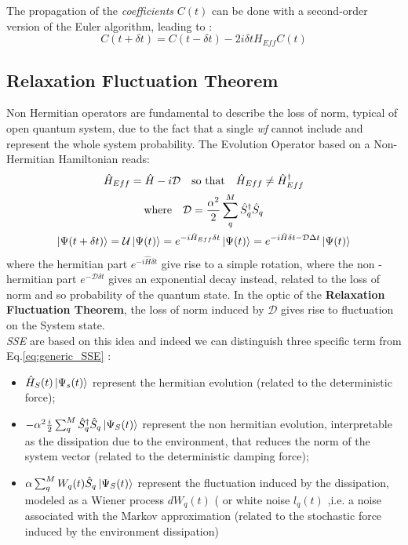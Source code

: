 \documentclass[a4paper,12pt]{article}
\begin{document}
	The propagation of the \textit{coefficients} $ C (t) $ can be done with a second-order version of the Euler algorithm, leading to :
	\begin{equation}
		C (t + \delta t) = C (t - \delta t) - 2i \delta t H_{Eff} C (t)
	\end{equation}
	
	\subsection{Relaxation Fluctuation Theorem}
	\label{sub:Relaxation_Fluctuation_Theorem}
	Non Hermitian operators are fundamental to describe the loss of norm, typical of open quantum system, due to the fact that a single \textit{wf} cannot include and represent the whole system probability. The Evolution Operator based on a Non-Hermitian Hamiltonian reads:
	\begin{gather}
		\hat{H}_{Eff} = \hat{H} -i\mathcal{D} \quad \text{so that} \quad \hat{H}_{Eff} \neq \hat{H}_{Eff}^{\dagger} \label{eq:Non_Hermitian_H} \\
		\text{where} \quad \mathcal{D} = \frac{\alpha^{2}}{2} \sum_{q}^{M}{\hat{S}^{\dagger}_{q} \hat{S}_{q}} \\
		\ket{\Psi (t +\delta t)} = \mathcal{U} \ket{\Psi(t)} = e^{-i \hat{H}_{Eff} \delta t} \ket{\Psi(t)}  = e^{-i \hat{H} \delta t - \mathcal{D} \Delta t} \ket{\Psi(t)} 
	\end{gather}
	where the hermitian part $ e^{-i \hat{H} \delta t} $ give rise to a simple rotation, where the non - hermitian part $ e^{- \mathcal{D} \delta t} $ gives an exponential decay instead, related to the loss of norm and so probability of the quantum state.
	In the optic of the \textbf{Relaxation Fluctuation Theorem}, the loss of norm induced by $ \mathcal{D} $ gives rise to fluctuation on the System state. \\
	\textit{SSE} are based on this idea and indeed we can distinguish three specific term from Eq.\eqref{eq:generic_SSE} : 
	\begin{itemize}
		\item $ \hat{H}_{S}(t)\ket{\Psi_{s}(t)} $ represent the hermitian evolution (related to the deterministic force);
		\item $ - \alpha^{2} \frac{i}{2} \sum_{q}^{M} {\hat{S}^{\dagger}_{q} \hat{S}_{q} \ket{\Psi_{S}(t)} } $ represent the non hermitian evolution, interpretable as the dissipation due to the environment, that reduces the norm of the system vector (related to the deterministic damping force);
		\item $ \alpha \sum_{q}^{M}W_{q}(t) \hat{S}_{q} \ket{\Psi_{S}(t)}  $ represent the fluctuation induced by the dissipation, modeled as a Wiener process $ dW_{q}(t) $ ( or white noise $ l_{q} (t) $  ,i.e. a  noise associated with the Markov approximation (related to the stochastic force induced by the environment dissipation)
	\end{itemize}
	
\end{document}
